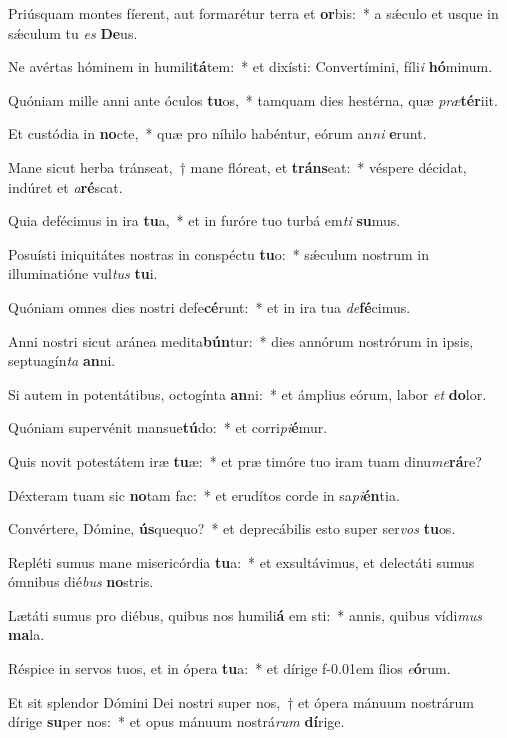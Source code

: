 \item Priúsquam montes fíerent, aut formarétur terra et \textbf{or}bis:~* a sǽculo et usque in sǽculum tu \textit{es} \textbf{De}us.
\item Ne avértas hóminem in humili\textbf{tá}tem:~* et dixísti: Convertímini, fíli\hspace{0.02 em}\textit{i} \textbf{hó}minum.
\item Quóniam mille anni ante óculos \textbf{tu}os,~* tamquam dies hestérna, quæ \textit{præ}\textbf{tér}iit.
\item Et custódia in \textbf{no}cte,~* quæ pro níhilo habéntur, eórum an\textit{ni} \textbf{e}runt.
\item Mane sicut herba tránseat,~† mane flóreat, et \textbf{tráns}eat:~* véspere décidat, indúret et \textit{a}\textbf{ré}scat.
\item Quia defécimus in ira \textbf{tu}a,~* et in furóre tuo turbá em\textit{ti} \textbf{su}mus.
\item Posuísti iniquitátes nostras in conspéctu \textbf{tu}o:~* sǽculum nostrum in illuminatióne vul\textit{tus} \textbf{tu}i.
\item Quóniam omnes dies nostri defe\textbf{cé}runt:~* et in ira tua \textit{de}\textbf{fé}cimus.
\item Anni nostri sicut aránea medita\textbf{bún}tur:~* dies annórum nostrórum in ipsis, septuagín\textit{ta} \textbf{an}ni.
\item Si autem in potentátibus, octogínta \textbf{an}ni:~* et ámplius eórum, labor \textit{et} \textbf{do}lor.
\item Quóniam supervénit mansue\textbf{tú}do:~* et corri\textit{pi}\hspace{-0.01em}\textbf{é}mur.
\item Quis novit potestátem iræ \textbf{tu}æ:~* et præ timóre tuo iram tuam dinu\textit{me}\textbf{rá}re?
\item Déxteram tuam sic \textbf{no}tam fac:~* et erudítos corde in sa\textit{pi}\textbf{én}tia.
\item Convértere, Dómine, \textbf{ús}quequo?~* et deprecábilis esto super ser\textit{vos} \textbf{tu}os.
\item Repléti sumus mane misericórdia \textbf{tu}a:~* et exsultávimus, et delectáti sumus ómnibus dié\textit{bus} \textbf{no}stris.
\item Lætáti sumus pro diébus, quibus nos humili\textbf{á} em sti:~* annis, quibus vídi\textit{mus} \textbf{ma}la.
\item Réspice in servos tuos, et in ópera \textbf{tu}a:~* et dírige f\kern -0.01em ílios \textit{e}\textbf{ó}rum.
\item Et sit splendor Dómini Dei nostri super nos,~† et ópera mánuum nostrárum dírige \textbf{su}per nos:~* et opus mánuum nostrá\textit{rum} \textbf{dí}rige.
